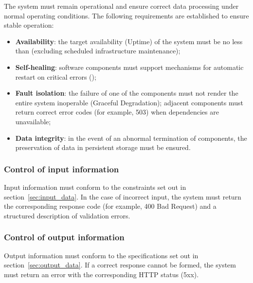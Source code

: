 \documentclass[12pt,a4paper]{extarticle}
\begin{document}
\begin{hseExample}
The system must remain operational and ensure correct data processing under normal operating conditions. The following requirements are established to ensure stable operation:
\begin{itemize}[nosep, leftmargin=1.25cm]
    \item \textbf{Availability}: the target availability (Uptime) of the system must be no less than  (excluding scheduled infrastructure maintenance);
    \item \textbf{Self-healing}: software components must support mechanisms for automatic restart on critical errors ();
    \item \textbf{Fault isolation}: the failure of one of the components must not render the entire system inoperable (Graceful Degradation); adjacent components must return correct error codes (for example, 503) when dependencies are unavailable;
    \item \textbf{Data integrity}: in the event of an abnormal termination of components, the preservation of data in persistent storage must be ensured.
\end{itemize}
\end{hseExample}

\subsubsection{Control of input information}

\begin{hseExample}
Input information must conform to the constraints set out in section~\ref{sec:input_data}. In the case of incorrect input, the system must return the corresponding response code (for example, 400 Bad Request) and a structured description of validation errors.
\end{hseExample}

\subsubsection{Control of output information}

\begin{hseExample}
Output information must conform to the specifications set out in section~\ref{sec:output_data}. If a correct response cannot be formed, the system must return an error with the corresponding HTTP status (5xx).
\end{hseExample}
\end{document}
